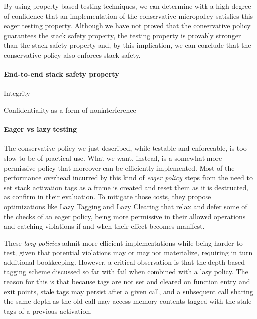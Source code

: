 \documentclass[acmsmall,review,anonymous]{acmart}\settopmatter{printfolios=true,printccs=false,printacmref=false}
\begin{document}
By using property-based testing techniques, we can determine with a high degree
of confidence that an implementation of the conservative micropolicy satisfies
this eager testing property. Although we have not proved that the conservative
policy guarantees the stack safety property, the testing property is provably
stronger than the stack safety property  and, by this implication,
we can conclude that the conservative policy also enforces stack safety.



\paragraph*{End-to-end stack safety property}

Integrity

Confidentiality as a form of noninterference

\paragraph*{Eager vs lazy testing}

The conservative policy we just described, while testable and enforceable, is
too slow to be of practical use. What we want, instead, is a somewhat more
permissive policy that moreover can be efficiently implemented. Most of the
performance overhead incurred by this kind of \emph{eager policy} steps from the
need to set stack activation tags as a frame is created and reset them as it is
destructed, as \citet{DBLP:conf/sp/RoesslerD18} confirm in their evaluation. To
mitigate those costs, they propose optimizations like Lazy Tagging and Lazy
Clearing that relax and defer some of the checks of an eager policy, being more
permissive in their allowed operations and catching violations if and when their
effect becomes manifest.

These \emph{lazy policies} admit more efficient implementations while being
harder to test, given that potential violations may or may not materialize,
requiring in turn additional bookkeeping. However, a critical observation is
that the depth-based tagging scheme discussed so far with fail when combined
with a lazy policy. The reason for this is that because tags are not set and
cleared on function entry and exit points, stale tags may persist after a given
call, and a subsequent call sharing the same depth as the old call may access
memory contents tagged with the stale tags of a previous activation.
\end{document}
